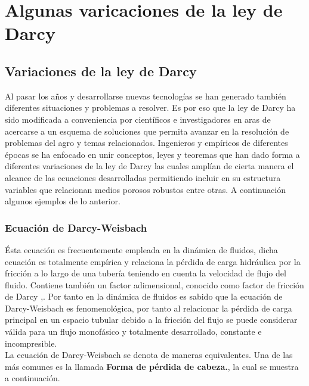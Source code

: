 


\section{Algunas varicaciones de la ley de Darcy}

\subsection{Variaciones de la ley de Darcy}

Al pasar los años y desarrollarse nuevas tecnologías se han generado también diferentes situaciones y problemas a resolver. Es por eso que la ley de Darcy ha sido modificada a conveniencia por científicos e investigadores en aras de acercarse a un esquema de soluciones que permita avanzar en la resolución de problemas del agro y temas relacionados. Ingenieros y empíricos  de diferentes épocas se ha enfocado en unir conceptos, leyes y teoremas que han dado forma a diferentes variaciones de la ley de Darcy las cuales amplían de cierta manera el alcance de las ecuaciones desarrolladas permitiendo incluir en su estructura variables que relacionan medios porosos robustos entre otras. A continuación algunos ejemplos de lo anterior.

\subsubsection{Ecuación de Darcy-Weisbach}


Ésta ecuación es frecuentemente empleada en la dinámica de fluidos, dicha ecuación es totalmente empírica y relaciona la pérdida de carga hidráulica por la fricción a lo largo de una tubería teniendo en cuenta la velocidad de flujo del fluido. Contiene también un factor adimensional, conocido como factor de fricción de Darcy \parencite{Farras2000},\parencite{Manning1991}. Por tanto en la dinámica de fluidos es sabido que la ecuación de Darcy-Weisbach es fenomenológica, por tanto al relacionar la pérdida de carga principal en un espacio tubular debido a la fricción del flujo se puede considerar válida para un flujo monofásico y totalmente desarrollado, constante e incompresible.\\

La ecuación de Darcy-Weisbach se denota de maneras equivalentes. Una de las más comunes es la llamada \textbf{Forma de pérdida de cabeza.}, la cual se muestra a continuación.

